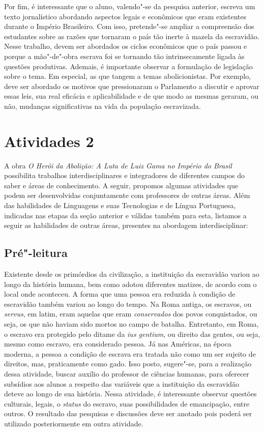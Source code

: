 \documentclass[12pt]{extarticle}
\begin{document}
Por fim, é interessante que o aluno, valendo"-se da pesquisa
anterior, escreva um texto jornalístico abordando aspectos legais e
econômicos que eram existentes durante o Império Brasileiro. Com isso,
pretende"-se ampliar a compreensão dos estudantes sobre as razões que
tornaram o país tão inerte à mazela da escravidão. Nesse trabalho, devem
ser abordados os ciclos econômicos que o país passou e porque a
mão"-de"-obra escrava foi se tornando tão intrinsecamente ligada às
questões produtivas. Ademais, é importante observar a formulação de
legislação sobre o tema. Em especial, as que tangem a temas
abolicionistas. Por exemplo, deve ser abordado os motivos que
pressionaram o Parlamento a discutir e aprovar essas leis, sua real
eficácia e aplicabilidade e de que modo as mesmas geraram, ou não,
mudanças significativas na vida da população escravizada.

\section{Atividades 2}

A obra \emph{O Herói da Abolição: A Luta de Luiz Gama no Império do
Brasil} possibilita trabalhos interdisciplinares e integradores de
diferentes campos do saber e áreas de conhecimento. A seguir, propomos
algumas atividades que podem ser desenvolvidas conjuntamente com
professores de outras áreas. Além das habilidades de Linguagens e suas
Tecnologias e de Língua Portuguesa, indicadas nas etapas da seção
anterior e válidas também para esta, listamos a seguir as habilidades de
outras áreas, presentes na abordagem interdisciplinar:


\subsection{Pré"-leitura}

Existente desde os primórdios da civilização, a instituição
da escravidão variou ao longo da história humana, bem como adotou
diferentes matizes, de acordo com o local onde aconteceu. A forma que
uma pessoa era reduzida à condição de escravidão também variou ao longo
do tempo. Na Roma antiga, os escravos, ou \emph{servus}, em latim, eram
aquelas que eram \emph{conservados} dos povos conquistados, ou seja, os
que não haviam sido mortos no campo de batalha. Entretanto, em Roma, o
escravo era protegido pelo ditame da \emph{ius gentium}, ou direito das
gentes, ou seja, mesmo como escravo, era considerado pessoa. Já nas
Américas, na época moderna, a pessoa a condição de escrava era tratada
não como um ser sujeito de direitos, mas, praticamente como gado. Isso
posto, sugere"-se, para a realização dessa atividade, buscar auxílio do
professor de ciências humanas, para oferecer subsídios aos alunos a
respeito das variáveis que a instituição da escravidão deteve ao longo
de sua história. Nessa atividade, é interessante observar questões
culturais, legais, o \emph{status} do escravo, suas possibilidades de
emancipação, entre outros. O resultado das pesquisas e discussões deve
ser anotado pois poderá ser utilizado posteriormente em outra atividade.
\end{document}
